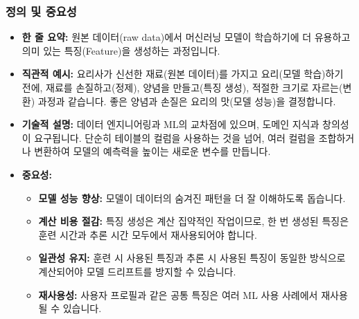 \documentclass[11pt,a4paper]{article}
\theoremstyle{definition}
\begin{document}
\subsubsection*{정의 및 중요성}
\begin{itemize}
    \item \textbf{한 줄 요약:} 원본 데이터(raw data)에서 머신러닝 모델이 학습하기에 더 유용하고 의미 있는 특징(Feature)을 생성하는 과정입니다.
    \item \textbf{직관적 예시:} 요리사가 신선한 재료(원본 데이터)를 가지고 요리(모델 학습)하기 전에, 재료를 손질하고(정제), 양념을 만들고(특징 생성), 적절한 크기로 자르는(변환) 과정과 같습니다. 좋은 양념과 손질은 요리의 맛(모델 성능)을 결정합니다.
    \item \textbf{기술적 설명:} 데이터 엔지니어링과 ML의 교차점에 있으며, 도메인 지식과 창의성이 요구됩니다. 단순히 테이블의 컬럼을 사용하는 것을 넘어, 여러 컬럼을 조합하거나 변환하여 모델의 예측력을 높이는 새로운 변수를 만듭니다.
    \item \textbf{중요성:}
    \begin{itemize}
        \item \textbf{모델 성능 향상:} 모델이 데이터의 숨겨진 패턴을 더 잘 이해하도록 돕습니다.
        \item \textbf{계산 비용 절감:} 특징 생성은 계산 집약적인 작업이므로, 한 번 생성된 특징은 훈련 시간과 추론 시간 모두에서 재사용되어야 합니다.
        \item \textbf{일관성 유지:} 훈련 시 사용된 특징과 추론 시 사용된 특징이 동일한 방식으로 계산되어야 모델 드리프트를 방지할 수 있습니다.
        \item \textbf{재사용성:} 사용자 프로필과 같은 공통 특징은 여러 ML 사용 사례에서 재사용될 수 있습니다.
    \end{itemize}
\end{itemize}
\end{document}
